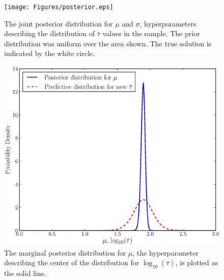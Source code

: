 \documentclass[useAMS,usenatbib]{mn2e}
\begin{document}
\begin{figure}
\begin{center}
\texttt{[image: Figures/posterior.eps]}
\caption{The joint posterior distribution for $\mu$ and $\sigma$, hyperparameters
describing the distribution of $\bar{\tau}$ values in the sample. The prior
distribution was uniform over the area shown.
The true solution is indicated by the white circle.\label{fig:posterior}}
\end{center}
\end{figure}

\begin{figure}
\begin{center}
\includegraphics[scale=0.35]{Figures/posterior2.eps}
\caption{The marginal posterior distribution for $\mu$, the 
hyperparameter describing the center of the distribution for
$\log_{10}\left(\bar{\tau}\right)$, is plotted as the solid line.
\label{fig:posterior2}}
\end{center}
\end{figure}
\end{document}

